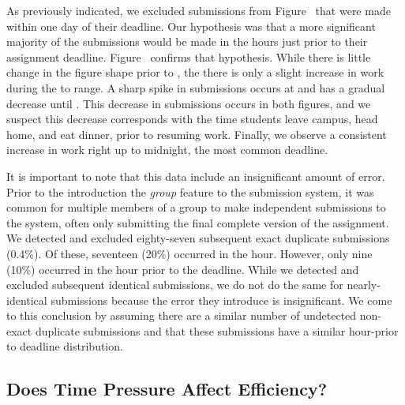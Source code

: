 As previously indicated, we excluded submissions from
Figure~ that were made within one day of their
deadline. Our hypothesis was that a more significant majority of the
submissions would be made in the hours just prior to their assignment
deadline. Figure~ confirms that hypothesis. While
there is little change in the figure shape prior to , the there is only
a slight increase in work during the  to  range. A sharp spike in
submissions occurs at  and has a gradual decrease until . This
decrease in submissions occurs in both figures, and we suspect this decrease
corresponds with the time students leave campus, head home, and eat dinner,
prior to resuming work. Finally, we observe a consistent increase in work right
up to midnight, the most common deadline.

It is important to note that this data include an insignificant amount of
error. Prior to the introduction the \emph{group} feature to the submission
system, it was common for multiple members of a group to make independent
submissions to the system, often only submitting the final complete version of
the assignment. We detected and excluded eighty-seven subsequent exact
duplicate submissions (0.4\%). Of these, seventeen (20\%) occurred in the
 hour. However, only nine (10\%) occurred in the hour prior to the
deadline. While we detected and excluded subsequent identical submissions, we
do not do the same for nearly-identical submissions because the error they
introduce is insignificant. We come to this conclusion by assuming there are
a similar number of undetected non-exact duplicate submissions and that these
submissions have a similar hour-prior to deadline distribution.

\subsection{Does Time Pressure Affect Efficiency?}

